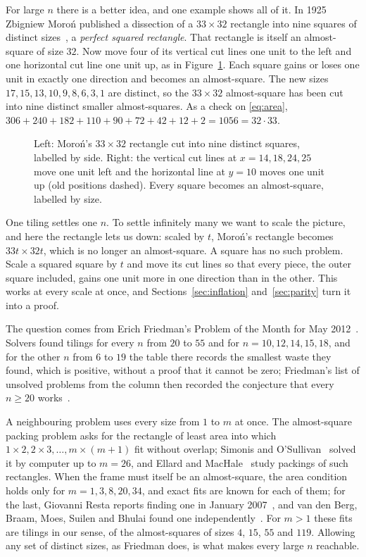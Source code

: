 \documentclass[11pt]{amsart}
\theoremstyle{definition}
\begin{document}
For large $n$ there is a better idea, and one example shows all of it. In 1925 Zbigniew Moro\'n
published a dissection of a $33\times32$ rectangle into nine squares of distinct
sizes~\cite{moron}, a \emph{perfect squared rectangle}. That rectangle is itself an almost-square of size $32$. Now
move four of its vertical cut lines one unit to the left and one horizontal cut line one unit up,
as in Figure~\ref{fig:moron}. Each square gains or loses one unit in exactly one direction and
becomes an almost-square. The new sizes $17,15,13,10,9,8,6,3,1$ are distinct, so the $33\times32$
almost-square has been cut into nine distinct smaller almost-squares. As a check on
\eqref{eq:area}, $306+240+182+110+90+72+42+12+2=1056=32\cdot33$.

\begin{figure}[ht]
\centering

\caption{Left: Moro\'n's $33\times32$ rectangle cut into nine distinct squares, labelled by side.
Right: the vertical cut lines at $x=14,18,24,25$ move one unit left and the horizontal line at
$y=10$ moves one unit up (old positions dashed). Every square becomes an almost-square, labelled
by size.}
\label{fig:moron}
\end{figure}

One tiling settles one $n$. To settle infinitely many we want to scale the picture, and here the
rectangle lets us down: scaled by $t$, Moro\'n's rectangle becomes $33t\times32t$, which is no longer
an almost-square. A square has no such problem. Scale a squared square by $t$ and move its cut lines
so that every piece, the outer square included, gains one unit more in one direction than in the
other. This works at every scale at once, and Sections~\ref{sec:inflation} and~\ref{sec:parity}
turn it into a proof.

The question comes from Erich Friedman's Problem of the Month for May
2012~\cite{friedman-0512}. Solvers found tilings for every $n$ from $20$ to $55$ and for
$n=10,12,14,15,18$, and for the other $n$ from $6$ to $19$ the table there records the smallest waste
they found, which is positive, without a proof that it cannot be zero; Friedman's list of unsolved problems from the column then recorded the
conjecture that every $n\ge20$ works~\cite{friedman-unsolved}.

A neighbouring problem uses every size from $1$ to $m$ at once. The almost-square packing problem asks
for the rectangle of least area into which $1\times2,2\times3,\dots,m\times(m+1)$ fit without overlap;
Simonis and O'Sullivan~\cite{simonis} solved it by computer up to $m=26$, and Ellard and
MacHale~\cite{ellard} study packings of such rectangles. When the frame must itself be
an almost-square, the area condition holds only for $m=1,3,8,20,34$, and exact fits are known for each
of them; for the last, Giovanni Resta reports finding one in January 2007~\cite{friedman-almost}, and van den Berg, Braam, Moes, Suilen and Bhulai found one independently~\cite{vdberg}. For $m>1$ these
fits are tilings in our sense, of the almost-squares of sizes $4$, $15$, $55$ and $119$. Allowing any
set of distinct sizes, as Friedman does, is what makes every large $n$ reachable.
\end{document}
